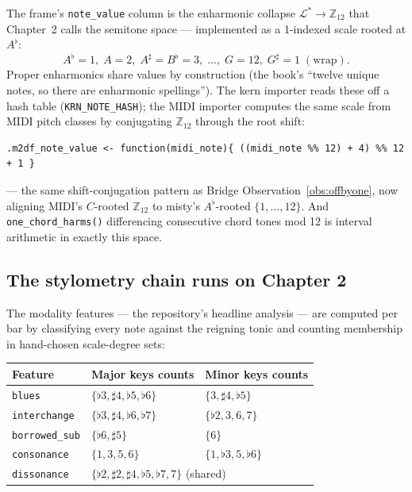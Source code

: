 \documentclass[11pt]{article}
\newcommand{\MAlph}{\mathcal{L}}                 %
\newcommand{\Lstar}{\MAlph^{*}}                  %
\newcommand{\Ztwelve}{\mathbb{Z}_{12}}
\theoremstyle{definition}
\theoremstyle{remark}
\newcommand{\code}[1]{\texttt{#1}}
\begin{document}
The frame's \code{note\_value} column is the enharmonic collapse
$\Lstar \to \Ztwelve$ that Chapter~2 calls the semitone space --- implemented
as a 1-indexed scale rooted at $A^{\flat}$:
$$A^{\flat} = 1,\; A = 2,\; A^{\sharp} = B^{\flat} = 3,\; \dots,\; G = 12,\;
G^{\sharp} = 1 \;(\text{wrap}).$$
Proper enharmonics share values by construction (the book's ``twelve unique
notes, so there are enharmonic spellings''). The kern importer reads these off
a hash table (\code{KRN\_NOTE\_HASH}); the MIDI importer computes the same
scale from MIDI pitch classes by conjugating $\Ztwelve$ through the root shift:
\begin{lstlisting}
.m2df_note_value <- function(midi_note){ ((midi_note %% 12) + 4) %% 12 + 1 }
\end{lstlisting}
--- the same shift-conjugation pattern as Bridge Observation~\ref{obs:offbyone},
now aligning MIDI's $C$-rooted $\Ztwelve$ to misty's $A^{\flat}$-rooted
$\{1, \dots, 12\}$. And \code{one\_chord\_harms()} differencing consecutive
chord tones mod 12 is interval arithmetic in exactly this space.

\subsection{The stylometry chain runs on Chapter 2}

The modality features --- the repository's headline analysis --- are computed
per bar by classifying every note against the reigning tonic and counting
membership in hand-chosen scale-degree sets:

\begin{center}
\renewcommand{\arraystretch}{1.3}
\begin{tabular}{@{}lll@{}}
\toprule
\textbf{Feature} & \textbf{Major keys counts} & \textbf{Minor keys counts} \\
\midrule
\code{blues} & $\{\flat 3, \sharp 4, \flat 5, \flat 6\}$ & $\{3, \sharp 4, \flat 5\}$ \\
\code{interchange} & $\{\flat 3, \sharp 4, \flat 6, \flat 7\}$ & $\{\flat 2, 3, 6, 7\}$ \\
\code{borrowed\_sub} & $\{\flat 6, \sharp 5\}$ & $\{6\}$ \\
\code{consonance} & $\{1, 3, 5, 6\}$ & $\{1, \flat 3, 5, \flat 6\}$ \\
\code{dissonance} & \multicolumn{2}{l}{$\{\flat 2, \sharp 2, \sharp 4, \flat 5, \flat 7, 7\}$ (shared)} \\
\bottomrule
\end{tabular}
\end{center}
\end{document}
